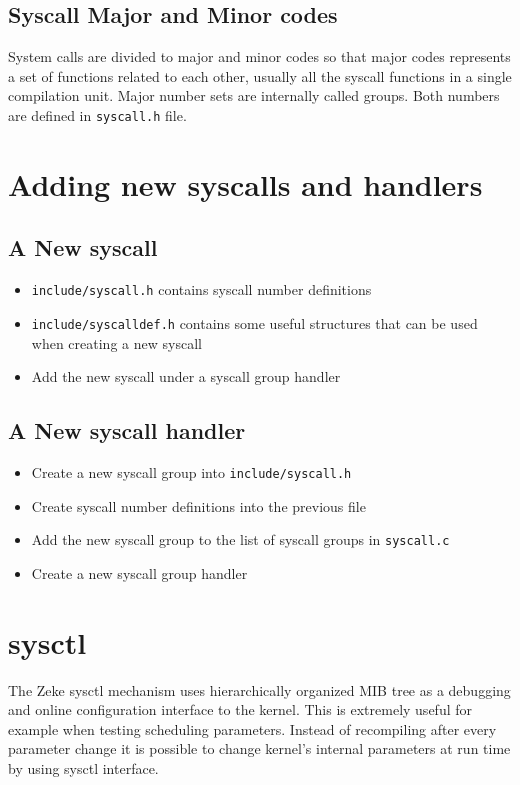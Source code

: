 \subsection{Syscall Major and Minor codes}

System calls are divided to major and minor codes so that major codes represents
a set of functions related to each other, usually all the syscall functions in a
single compilation unit. Major number sets are internally called groups. Both
numbers are defined in \verb+syscall.h+ file.


\section{Adding new syscalls and handlers}

\subsection{A New syscall}

\begin{itemize}
\item \verb+include/syscall.h+ contains syscall number definitions
\item \verb+include/syscalldef.h+ contains some useful structures that can be used when
      creating a new syscall
\item Add the new syscall under a syscall group handler
\end{itemize}

\subsection{A New syscall handler}

\begin{itemize}
\item Create a new syscall group into \verb+include/syscall.h+
\item Create syscall number definitions into the previous file
\item Add the new syscall group to the list of syscall groups in \verb+syscall.c+
\item Create a new syscall group handler
\end{itemize}


\section{sysctl}

The Zeke sysctl mechanism uses hierarchically organized \ac{MIB} tree as a
debugging and online configuration interface to the kernel. This is extremely
useful for example when testing scheduling parameters. Instead of recompiling
after every parameter change it is possible to change kernel's internal
parameters at run time by using sysctl interface.

